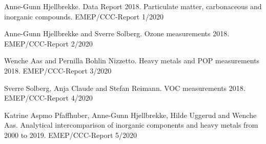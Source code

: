 \enlargethispage{\baselineskip}
\begin{list}{}{\setlength{\leftmargin}{15pt}\setlength{\itemindent}{-\leftmargin}}\small
\item[]
Anne-Gunn Hjellbrekke. 
Data Report 2018. Particulate matter, carbonaceous and inorganic compounds.
EMEP/CCC-Report 1/2020

\item[]
Anne-Gunn Hjellbrekke and Sverre Solberg. 
Ozone measurements 2018. 
EMEP/CCC-Report 2/2020

\item[]
Wenche Aas and Pernilla Bohlin Nizzetto. 
Heavy metals and POP measurements 2018.
EMEP/CCC-Report 3/2020

\item[]
Sverre Solberg, Anja Claude and Stefan Reimann. 
VOC measurements 2018. 
EMEP/CCC-Report 4/2020

\item[]
Katrine Aspmo Pfaffhuber, Anne-Gunn Hjellbrekke, Hilde Uggerud  and Wenche Aas. 
Analytical intercomparison of inorganic components and heavy metals from 2000 to 2019.
EMEP/CCC-Report 5/2020
\end{list}



